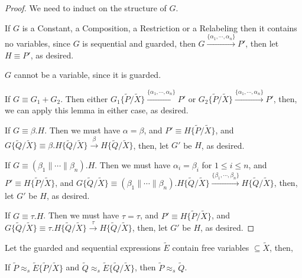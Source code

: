 \begin{proof}
We need to induct on the structure of $G$.

If $G$ is a Constant, a Composition, a Restriction or a Relabeling then it contains no variables, since $G$ is sequential and guarded, then $G\xrightarrow{\{\alpha_1,\cdots,\alpha_n\}}P'$, then let $H\equiv P'$, as desired.

$G$ cannot be a variable, since it is guarded.

If $G\equiv G_1+G_2$. Then either $G_1\{\widetilde{P}/\widetilde{X}\} \xrightarrow{\{\alpha_1,\cdots,\alpha_n\}}P'$ or $G_2\{\widetilde{P}/\widetilde{X}\} \xrightarrow{\{\alpha_1,\cdots,\alpha_n\}}P'$, then, we can apply this lemma in either case, as desired.

If $G\equiv\beta.H$. Then we must have $\alpha=\beta$, and $P'\equiv H\{\widetilde{P}/\widetilde{X}\}$, and $G\{\widetilde{Q}/\widetilde{X}\}\equiv \beta.H\{\widetilde{Q}/\widetilde{X}\} \xrightarrow{\beta}H\{\widetilde{Q}/\widetilde{X}\}$, then, let $G'$ be $H$, as desired.

If $G\equiv(\beta_1\parallel\cdots\parallel\beta_n).H$. Then we must have $\alpha_i=\beta_i$ for $1\leq i\leq n$, and $P'\equiv H\{\widetilde{P}/\widetilde{X}\}$, and $G\{\widetilde{Q}/\widetilde{X}\}\equiv (\beta_1\parallel\cdots\parallel\beta_n).H\{\widetilde{Q}/\widetilde{X}\} \xrightarrow{\{\beta_1,\cdots,\beta_n\}}H\{\widetilde{Q}/\widetilde{X}\}$, then, let $G'$ be $H$, as desired.

If $G\equiv\tau.H$. Then we must have $\tau=\tau$, and $P'\equiv H\{\widetilde{P}/\widetilde{X}\}$, and $G\{\widetilde{Q}/\widetilde{X}\}\equiv \tau.H\{\widetilde{Q}/\widetilde{X}\} \xrightarrow{\tau}H\{\widetilde{Q}/\widetilde{X}\}$, then, let $G'$ be $H$, as desired.
\end{proof}

\begin{theorem}\label{USWSB}
Let the guarded and sequential expressions $\widetilde{E}$ contain free variables $\subseteq \widetilde{X}$, then,

If $\widetilde{P}\approx_s \widetilde{E}\{\widetilde{P}/\widetilde{X}\}$ and $\widetilde{Q}\approx_s \widetilde{E}\{\widetilde{Q}/\widetilde{X}\}$, then $\widetilde{P}\approx_s \widetilde{Q}$.
\end{theorem}

